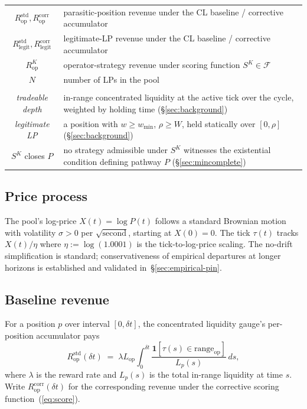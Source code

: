 \documentclass[11pt,a4paper]{article}
\theoremstyle{definition}
\theoremstyle{plain}
\theoremstyle{remark}
\begin{document}
{\begin{longtable}{@{}cL{8.5cm}@{}}
$R^{\text{std}}_{\text{op}}, R^{\text{corr}}_{\text{op}}$ & parasitic-position revenue under the CL baseline / corrective accumulator \\
$R^{\text{std}}_{\text{legit}}, R^{\text{corr}}_{\text{legit}}$ & legitimate-LP revenue under the CL baseline / corrective accumulator \\
$R^K_{\text{op}}$ & operator-strategy revenue under scoring function $S^K \in \mathcal{F}$ \\
$N$ & number of LPs in the pool \\
\addlinespace[8pt]
 \\
\addlinespace[3pt]
\emph{tradeable depth} & in-range concentrated liquidity at the active tick over the cycle, weighted by holding time (\S\ref{sec:background}) \\
\emph{legitimate LP} & a position with $w \geq w_{\min}$, $\rho \geq W$, held statically over $[0, \rho]$ (\S\ref{sec:background}) \\
$S^K$ closes $P$ & no strategy admissible under $S^K$ witnesses the existential condition defining pathway $P$ (\S\ref{sec:mincomplete}) \\
\end{longtable}
}

\subsection*{Price process}

The pool's log-price $X(t) = \log P(t)$ follows a standard Brownian motion with volatility $\sigma > 0$ per $\sqrt{\text{second}}$, starting at $X(0) = 0$. The tick $\tau(t)$ tracks $X(t)/\eta$ where $\eta := \log(1.0001)$ is the tick-to-log-price scaling. The no-drift simplification is standard\cite{milionis2022b}; conservativeness of empirical departures at longer horizons is established and validated in~\S\ref{sec:empirical-pin}.

\subsection*{Baseline revenue}

For a position $p$ over interval $[0, \delta t]$, the concentrated liquidity gauge's per-position accumulator pays
\[
R^{\text{std}}_{\text{op}}(\delta t) \;=\; \lambda L_{\text{op}} \int_0^{\delta t} \frac{\mathbf{1}[\tau(s) \in \text{range}_{\text{op}}]}{L_p(s)}\,ds,
\]
where $\lambda$ is the reward rate and $L_p(s)$ is the total in-range liquidity at time $s$. Write $R^{\text{corr}}_{\text{op}}(\delta t)$ for the corresponding revenue under the corrective scoring function~(\ref{eq:score}).
\end{document}
